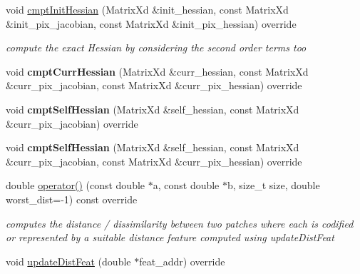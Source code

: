 \begin{DoxyCompactItemize}
\item 
\hypertarget{classSumOfAMs_a360c34b973f66f42755cc6cd9ce7c916}{void \hyperlink{classSumOfAMs_a360c34b973f66f42755cc6cd9ce7c916}{cmpt\-Init\-Hessian} (Matrix\-Xd \&init\-\_\-hessian, const Matrix\-Xd \&init\-\_\-pix\-\_\-jacobian, const Matrix\-Xd \&init\-\_\-pix\-\_\-hessian) override}\label{classSumOfAMs_a360c34b973f66f42755cc6cd9ce7c916}

\begin{DoxyCompactList}\small\item\em compute the exact Hessian by considering the second order terms too \end{DoxyCompactList}\item 
\hypertarget{classSumOfAMs_ae01bc2a4a2f77efb20422fcc0e8ad50b}{void {\bfseries cmpt\-Curr\-Hessian} (Matrix\-Xd \&curr\-\_\-hessian, const Matrix\-Xd \&curr\-\_\-pix\-\_\-jacobian, const Matrix\-Xd \&curr\-\_\-pix\-\_\-hessian) override}\label{classSumOfAMs_ae01bc2a4a2f77efb20422fcc0e8ad50b}

\item 
\hypertarget{classSumOfAMs_a30d1faa9857e50e2aa3d6894cb748a69}{void {\bfseries cmpt\-Self\-Hessian} (Matrix\-Xd \&self\-\_\-hessian, const Matrix\-Xd \&curr\-\_\-pix\-\_\-jacobian) override}\label{classSumOfAMs_a30d1faa9857e50e2aa3d6894cb748a69}

\item 
\hypertarget{classSumOfAMs_add185e48f22a1d240aefa8646340ee6e}{void {\bfseries cmpt\-Self\-Hessian} (Matrix\-Xd \&self\-\_\-hessian, const Matrix\-Xd \&curr\-\_\-pix\-\_\-jacobian, const Matrix\-Xd \&curr\-\_\-pix\-\_\-hessian) override}\label{classSumOfAMs_add185e48f22a1d240aefa8646340ee6e}

\item 
\hypertarget{classSumOfAMs_a50327a1904871dd9922eae93d5279f12}{double \hyperlink{classSumOfAMs_a50327a1904871dd9922eae93d5279f12}{operator()} (const double $\ast$a, const double $\ast$b, size\-\_\-t size, double worst\-\_\-dist=-\/1) const override}\label{classSumOfAMs_a50327a1904871dd9922eae93d5279f12}

\begin{DoxyCompactList}\small\item\em computes the distance / dissimilarity between two patches where each is codified or represented by a suitable distance feature computed using update\-Dist\-Feat \end{DoxyCompactList}\item 
\hypertarget{classSumOfAMs_afbdab677e4439e2e474a9121fb1553bf}{void \hyperlink{classSumOfAMs_afbdab677e4439e2e474a9121fb1553bf}{update\-Dist\-Feat} (double $\ast$feat\-\_\-addr) override}\label{classSumOfAMs_afbdab677e4439e2e474a9121fb1553bf}


\end{DoxyCompactItemize}
